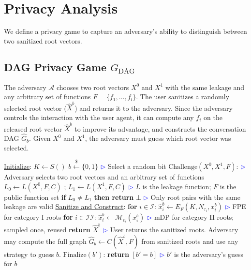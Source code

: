 \section{Privacy Analysis}

\noindent We define a privacy game to capture an adversary's ability to distinguish between two sanitized root vectors.

\subsection{DAG Privacy Game $G_{\mathrm{DAG}}$}

The adversary $\mathcal{A}$ chooses two root vectors $X^0$ and $X^1$ with the same leakage and any arbitrary set of functions $F=\{f_1, \dots, f_l\}$. The user sanitizes a randomly selected root vector ($\hat{X}^b$) and returns it to the adversary. Since the adversary controls the interaction with the user agent, it can compute any $f_i$ on the released root vector $\hat{X}^b$ to improve its advantage, and constructs the conversation DAG $\hat{G}_b$. Given $X^0$ and $X^1$, the adversary must guess which root vector was selected. 

\begin{algorithmic}[1]
\Statex \underline{Initialize}:
\State $K \leftarrow S()$
\State $b \overset{{\scriptscriptstyle\$}}{\leftarrow} \{0,1\}$ \textcolor{blue}{$\rhd$} Select a random bit
\Statex \underline{$\mathrm{Challenge}(X^0, X^1,F)$}: \textcolor{blue}{$\rhd$} Adversary selects two root vectors and an arbitrary set of functions
\State $L_0 \gets L(X^0, F, C)$ ; $L_1 \gets L(X^1, F, C)$
\Statex \textcolor{blue}{$\rhd$} $L$ is the leakage function; $F$ is the public function set
\State \textbf{if} $L_0 \neq L_1$ \textbf{then return} $\bot$
\Statex \textcolor{blue}{$\rhd$} Only root pairs with the same leakage are valid
\Statex \underline{Sanitize and Construct}:
\State \textbf{for} $i \in \mathcal{I}$: $\hat{x}^b_i \gets E_F(K, N_{\tau_i}, x^b_i)$ \textcolor{blue}{$\rhd$} FPE for category-I roots
\State \textbf{for} $i \in \mathcal{II}$: $\hat{x}^b_i \gets \mathcal{M}_{\epsilon_i}(x^b_i)$ \textcolor{blue}{$\rhd$} mDP for category-II roots; sampled once, reused
\State \textbf{return} $\hat{X}^b$ \hfill \textcolor{blue}{$\rhd$} User returns the sanitized roots. Adversary may compute the full graph $\hat{G}_b \gets C(\hat{X}^b, F)$ from sanitized roots and use any strategy to guess $b$.
\Statex \underline{$\mathrm{Finalize}(b')$}:
\State \textbf{return} $[b' = b]$ \hfill \textcolor{blue}{$\rhd$} $b'$ is the adversary's guess for $b$
\end{algorithmic}

